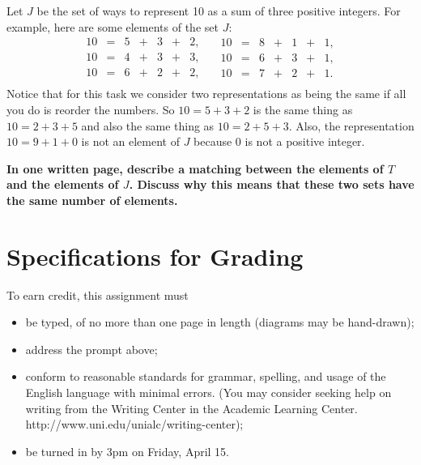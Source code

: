 \documentclass[12pt,letterpaper]{article}
\begin{document}
Let $J$ be the set of ways to represent 10 as a sum of three positive integers.
For example, here are some elements of the set $J$:
\begin{equation*}
\begin{array}{ccccccc}
10 & =& 5 &+& 3 &+& 2, \\
10 & =& 4 &+& 3 &+& 3,\\
10 & =& 6 & +&2 &+& 2, \\
\end{array}
\quad
\begin{array}{ccccccc}
10 & =& 8 &+& 1 &+& 1, \\
10 & =& 6 &+& 3 &+& 1,\\
10 & =& 7 & +&2 &+& 1. \\
\end{array}
\end{equation*}
Notice that for this task we consider two representations as being the same if all you do is reorder the numbers.
So $10 = 5 + 3 +2$ is the same thing as $10 = 2 + 3 + 5$ and also the same thing as $10 = 2 + 5 + 3$.
Also, the representation $10 = 9 + 1 + 0$ is not an element of $J$ because $0$ is not a positive integer.

\textbf{In one written page, describe a matching between the elements of $T$ and the elements of $J$.
Discuss why this means that these two sets have the same number of elements.}


\section*{Specifications for Grading}

To earn credit, this assignment must
\begin{itemize}
\item be typed, of no more than one page in length (diagrams may be hand-drawn);
\item address the prompt above;
\item conform to reasonable standards for grammar, spelling, and usage of the English language with minimal errors. (You may consider seeking help on writing from the Writing Center in the Academic Learning Center. http://www.uni.edu/unialc/writing-center);
\item be turned in by 3pm on Friday, April 15.
\end{itemize}
\end{document}
